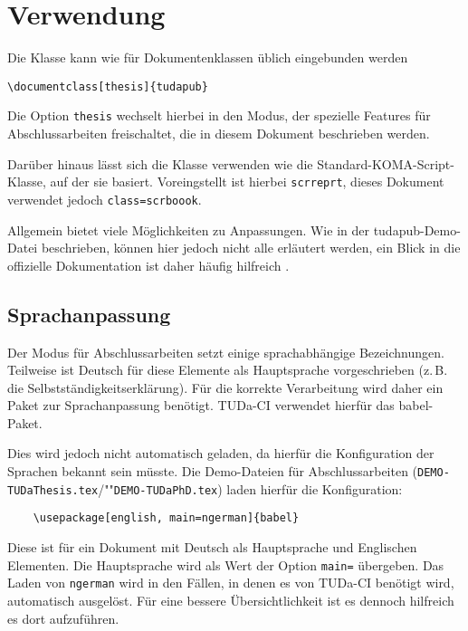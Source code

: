 \documentclass[
	ngerman,
	ruledheaders=chapter,%
	class=book,%
	thesis={
		type=dr,
		dr=rernat
	},
	accentcolor=9c,%
	custommargins=true,%
	marginpar=false,%
	fontsize=11pt,%
]{tudapub}
\let\file\texttt
\let\code\texttt
\begin{document}
\begin{abstract}
	Deutsche Zusammenfassung
\end{abstract}

\begin{abstract}[english]
	Englische Zusammenfassung, falls benötigt
\end{abstract}

\tableofcontents


\mainmatter



\chapter{Verwendung}
Die Klasse kann wie für Dokumentenklassen üblich eingebunden werden
\begin{verbatim}
\documentclass[thesis]{tudapub}
\end{verbatim}
Die Option \code{thesis} wechselt hierbei in den Modus, der spezielle Features für Abschlussarbeiten freischaltet, die in diesem Dokument beschrieben werden.

Darüber hinaus lässt sich die Klasse verwenden wie die Standard-KOMA-Script-Klasse, auf der sie basiert.
Voreingstellt ist hierbei \code{scrreprt}, dieses Dokument verwendet jedoch \code{class=scrboook}.

Allgemein bietet \KOMAScript{} viele Möglichkeiten zu Anpassungen. Wie in der tudapub-Demo-Datei beschrieben, können hier jedoch nicht alle erläutert werden, ein Blick in die offizielle Dokumentation ist daher häufig hilfreich \cite{scrguide}.

\section{Sprachanpassung}
Der Modus für Abschlussarbeiten setzt einige sprachabhängige Bezeichnungen.
Teilweise ist Deutsch für diese Elemente als Hauptsprache vorgeschrieben (z.\,B. die Selbstständigkeitserklärung). Für die korrekte Verarbeitung wird daher ein Paket zur Sprachanpassung benötigt.
TUDa-CI verwendet hierfür das babel-Paket.

Dies wird jedoch nicht automatisch geladen, da hierfür die Konfiguration der Sprachen bekannt sein müsste. Die Demo-Dateien für Abschlussarbeiten (\file{DEMO-TUDaThesis.tex}/""\file{DEMO-TUDaPhD.tex}) laden hierfür die Konfiguration:
\begin{verbatim}
	\usepackage[english, main=ngerman]{babel}
\end{verbatim}
Diese ist für ein Dokument mit Deutsch als Hauptsprache und Englischen Elementen.
Die Hauptsprache wird als Wert der Option \verb+main=+ übergeben.
Das Laden von \verb+ngerman+ wird in den Fällen, in denen es von TUDa-CI benötigt wird, automatisch ausgelöst.
Für eine bessere Übersichtlichkeit ist es dennoch hilfreich es dort aufzuführen.
\end{document}
